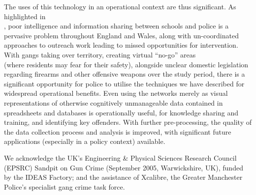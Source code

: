 \documentclass[twocolumn]{svjour3}          %
\theoremstyle{definition}
\begin{document}
The uses of this technology in an operational context are thus
significant. As highlighted in\\ \citet{golding+mcclory:2008}, poor
intelligence and information sharing between schools and police is a
pervasive problem throughout England and Wales, along with
un-coordinated approaches to outreach work leading to missed
opportunities for intervention.  With gangs taking over territory,
creating virtual ``no-go'' areas\\(where residents may fear for their
safety), alongside unclear domestic legislation regarding firearms and
other offensive weapons over the study period, there is a significant
opportunity for police to utilise the techniques we have described for
widespread operational benefits. Even using the networks merely as
visual representations of otherwise cognitively unmanageable data
contained in spreadsheets and databases is operationally useful, for
knowledge sharing and training, and identifying key offenders. With
further pre-processing, the quality of the data collection process and
analysis is improved, with significant future applications (especially
in a policy context) available.

\begin{acknowledgements}
We acknowledge the UK's Engineering \& Physical Sciences Research
Council (EPSRC) Sandpit on Gun Crime (September 2005, Warwickshire,
UK), funded by the IDEAS Factory; and the assistance of Xcalibre, the Greater
Manchester Police's specialist gang crime task force.
\end{acknowledgements}

\end{document}
